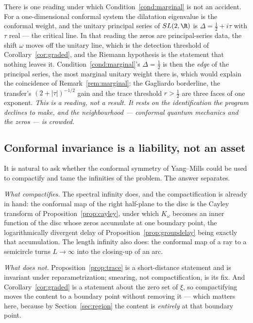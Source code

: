 \begin{remark}
\label{rem:principal}
There is one reading under which Condition~\ref{cond:marginal} is not an accident.
For a one-dimensional conformal system the dilatation eigenvalue is the conformal
weight, and the unitary principal series of $SL(2,\R)$ is $\Delta=\frac12+i\tau$
with $\tau$ real --- the critical line. In that reading the zeros are
principal-series data, the shift $\omega$ moves off the unitary line, which is the
detection threshold of Corollary~\ref{cor:graded}, and the Riemann hypothesis is
the statement that nothing leaves it. Condition~\ref{cond:marginal}'s
$\Delta=\frac12$ is then the \emph{edge} of the principal series, the most
marginal unitary weight there is, which would explain the coincidence of
Remark~\ref{rem:marginal}: the Gagliardo borderline, the transfer's
$(2+|\tau|)^{-1/2}$ gain and the trace threshold $r>\frac12$ are three faces of
one exponent. \emph{This is a reading, not a result. It rests on the
identification the program declines to make, and the neighbourhood --- conformal
quantum mechanics and the zeros --- is crowded.}
\end{remark}

\subsection{Conformal invariance is a liability, not an asset}

It is natural to ask whether the conformal symmetry of Yang--Mills could be used
to compactify and tame the infinities of the problem. The answer separates.

\emph{What compactifies.} The spectral infinity does, and the compactification is
already in hand: the conformal map of the right half-plane to the disc is the
Cayley transform of Proposition~\ref{prop:cayley}, under which $K_\omega$ becomes
an inner function of the disc whose zeros accumulate at one boundary point, the
logarithmically divergent delay of Proposition~\ref{prop:groupdelay} being exactly
that accumulation. The length infinity also does: the conformal map of a ray to a
semicircle \cite{OWL} turns $L\to\infty$ into the closing-up of an arc.

\emph{What does not.} Proposition~\ref{prop:trace} is a short-distance statement
and is invariant under reparametrization; smearing, not compactification, is its
fix. And Corollary~\ref{cor:graded} is a statement about the zero set of $\xi$,
so compactifying moves the content to a boundary point without removing it ---
which matters here, because by Section~\ref{sec:region} the content is
\emph{entirely} at that boundary point.

